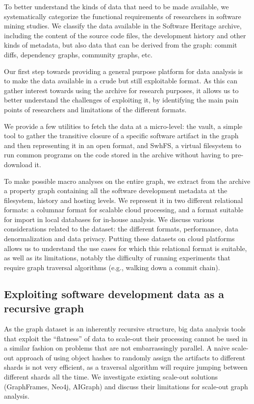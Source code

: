 To better understand the kinds of data that need to be made available, we
systematically categorize the functional requirements of researchers in
software mining studies.  We classify the data available in the Software
Heritage archive, including the content of the source code files, the
development history and other kinds of metadata, but also data that can be
derived from the graph: commit diffs, dependency graphs, community graphs, etc.

Our first step towards providing a general purpose platform for data analysis
is to make the data available in a crude but still exploitable format. As this
can gather interest towards using the archive for research purposes, it
allows us to better understand the challenges of exploiting it, by identifying
the main pain points of researchers and limitations of the different formats.

We provide a few utilities to fetch the data at a micro-level: the vault, a
simple tool to gather the transitive closure of a specific software artifact in
the graph and then representing it in an open format, and SwhFS, a virtual
filesystem to run common programs on the code stored in the archive without
having to pre-download it.

To make possible macro analyses on the entire graph, we extract from the
archive a property graph containing all the software development metadata at
the filesystem, history and hosting levels. We represent it in two different
relational formats: a columnar format for scalable cloud processing, and a
format suitable for import in local databases for in-house analysis. We discuss
various considerations related to the dataset: the different formats,
performance, data denormalization and data privacy.
Putting these datasets on cloud platforms allows us to understand the use cases
for which this relational format is suitable, as well as its limitations,
notably the difficulty of running experiments that require graph traversal
algorithms (e.g., walking down a commit chain).

\subsection*{Exploiting software development data as a recursive graph}

As the graph dataset is an inherently recursive structure, big data analysis
tools that exploit the ``flatness'' of data to scale-out their processing cannot
be used in a similar fashion on problems that are not embarrassingly parallel.
A naive scale-out approach of using object hashes to randomly assign the
artifacts to different shards is not very efficient, as a traversal algorithm
will require jumping between different shards all the time. We investigate
existing scale-out solutions (GraphFrames, Neo4j, AIGraph) and discuss their
limitations for scale-out graph analysis.


